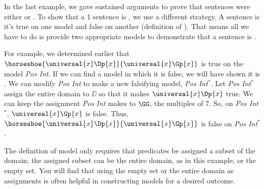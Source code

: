In the last example, we gave sustained arguments to prove that sentences were either  or .  To show that a \GQL{}1 sentence is , we use a different strategy.  A sentence is  \Iff it's true on one model and false on another (definition of ).  That means all we have to do is provide two appropriate models to demonstrate that a sentence is .

For example, we determined earlier that $\horseshoe{\universal{\variable{x}}\Dp{\variable{x}}}{\universal{\variable{x}}\Gp{\variable{x}}}$ is true on the model \emph{Pos Int}.  If we can find a model in which it is false, we will have shown it is .  We can modify \emph{Pos Int} to make a new falsifying model, \emph{Pos Int$^*$}.  Let \emph{Pos Int$^*$} assign the entire domain to $\DD$ so that it makes $\universal{\variable{x}}\Dp{\variable{x}}$ true.  We can keep the assignment \emph{Pos Int} makes to $\GG$, the multiples of 7.  So, on \emph{Pos Int$^*$}, $\universal{\variable{x}}\Gp{\variable{x}}$ is false.  Thus, $\horseshoe{\universal{\variable{x}}\Dp{\variable{x}}}{\universal{\variable{x}}\Gp{\variable{x}}}$ is false on \emph{Pos Int$^*$}.

The definition of model only requires that predicates be assigned a subset of the domain; the assigned subset can be the entire domain, as in this example, or the empty set.  You will find that using the empty set or the entire domain as assignments is often helpful in  constructing models for a desired outcome.

